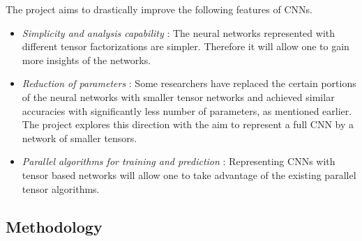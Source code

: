 The \prname project aims to drastically improve the following features of CNNs.
\begin{itemize}
	\item \emph{Simplicity and analysis capability} : The neural networks represented with different tensor factorizations are simpler. Therefore it will allow one to gain more insights of the networks.
	\item \emph{Reduction of parameters} : Some researchers have replaced the certain portions of the neural networks with smaller tensor networks and achieved  similar accuracies with significantly less number of parameters, as mentioned earlier. The \prname project explores this direction with the aim to represent a full CNN by a network of smaller tensors. 
	\item \emph{Parallel algorithms for training and prediction} : Representing CNNs with tensor based networks will allow one to take advantage of the existing parallel tensor algorithms.
\end{itemize}


\subsection*{Methodology} 


